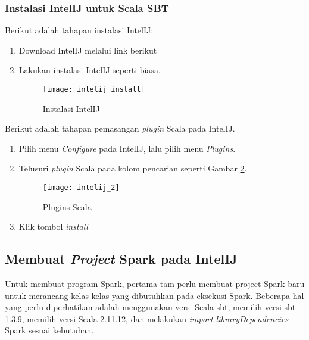 \newpage
\subsubsection{Instalasi IntelIJ untuk Scala SBT}
Berikut adalah tahapan instalasi IntelIJ:

\begin{enumerate}
\item Download IntelIJ melalui link berikut \\

\item Lakukan instalasi IntelIJ seperti biasa.
\begin{figure}[H]
	\centering
	\texttt{[image: intelij\_install]}
	\caption{Instalasi IntelIJ}
	\label{fig:intelij_install}
\end{figure}

\end{enumerate}

\noindent Berikut adalah tahapan pemasangan \textit{plugin} Scala pada IntelIJ.

\begin{enumerate}

\item Pilih menu \textit{Configure} pada IntelIJ, lalu pilih menu \textit{Plugins}.

\item Telusuri \textit{plugin} Scala pada kolom pencarian seperti Gambar \ref{fig:intelij_2}.
\begin{figure}[H]
	\centering
	\texttt{[image: intelij\_2]}
	\caption{Plugins Scala}
	\label{fig:intelij_2}
\end{figure}

\item Klik tombol \textit{install}

\end{enumerate}

\newpage
\subsection{Membuat \textit{Project} Spark pada IntelIJ}
Untuk membuat program Spark, pertama-tam perlu membuat project Spark baru untuk merancang kelas-kelas yang dibutuhkan pada eksekusi Spark. Beberapa hal yang perlu diperhatikan adalah menggunakan versi Scala sbt, memilih versi sbt 1.3.9, memilih versi Scala 2.11.12, dan melakukan \textit{import libraryDependencies} Spark sesuai kebutuhan.\\

